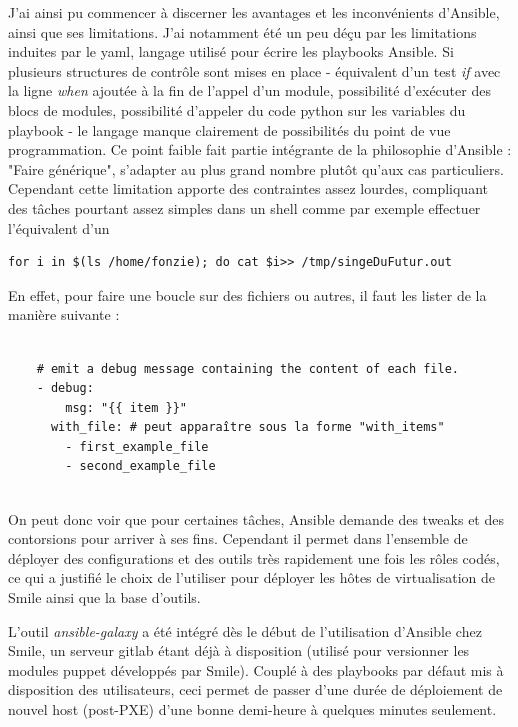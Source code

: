 \documentclass[14 pt,a4paper]{extreport}
\begin{document}
J'ai ainsi pu commencer à discerner les avantages et les inconvénients d'Ansible, ainsi que ses limitations. J'ai notamment été un peu déçu par les limitations induites par le yaml, langage utilisé pour écrire les playbooks Ansible. Si plusieurs structures de contrôle sont mises en place - équivalent d'un test \emph{if} avec la ligne \emph{when} ajoutée à la fin de l'appel d'un module, possibilité d'exécuter des blocs de modules, possibilité d'appeler du code python sur les variables du playbook - le langage manque clairement de possibilités du point de vue programmation. Ce point faible fait partie intégrante de la philosophie d'Ansible : "Faire générique", s'adapter au plus grand nombre plutôt qu'aux cas particuliers. Cependant cette limitation apporte des contraintes assez lourdes, compliquant des tâches pourtant assez simples dans un shell comme par exemple effectuer l'équivalent d'un \begin{verbatim}for i in $(ls /home/fonzie); do cat $i>> /tmp/singeDuFutur.out \end{verbatim} 

En effet, pour faire une boucle sur des fichiers ou autres, il faut les lister de la manière suivante :

\begin{framed}
\begin{Verbatim}[fontsize=\scriptsize]

    # emit a debug message containing the content of each file.
    - debug:
        msg: "{{ item }}"
      with_file: # peut apparaître sous la forme "with_items"
        - first_example_file
        - second_example_file
        
\end{Verbatim}
\end{framed}

On peut donc voir que pour certaines tâches, Ansible demande des tweaks et des contorsions pour arriver à ses fins. Cependant il permet dans l'ensemble de déployer des configurations et des outils très rapidement une fois les rôles codés, ce qui a justifié le choix de l'utiliser pour déployer les hôtes de virtualisation de Smile ainsi que la base d'outils. 

L'outil \emph{ansible-galaxy} a été intégré dès le début de l'utilisation d'Ansible chez Smile, un serveur gitlab étant déjà à disposition (utilisé pour versionner les modules puppet développés par Smile). Couplé à des playbooks par défaut mis à disposition des utilisateurs, ceci permet de passer d'une durée de déploiement de nouvel host (post-PXE) d'une bonne demi-heure à quelques minutes seulement.
\end{document}
